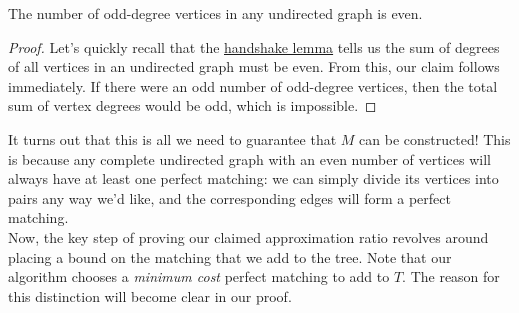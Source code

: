 \documentclass{article}
\newenvironment{lemma}[2][Lemma]{\begin{trivlist}
\item[\hskip \labelsep {\bfseries #1}\hskip \labelsep {\bfseries #2.}]}{\end{trivlist}}
\begin{document}
\begin{lemma}{3.2}{}
    The number of odd-degree vertices in any undirected graph is even.

    \begin{proof}
        Let's quickly recall that the \href{https://en.wikipedia.org/wiki/Handshaking_lemma}{\underline{handshake lemma}} tells us the sum of degrees of all vertices in an undirected graph must be even. From this, our claim follows immediately. If there were an odd number of odd-degree vertices, then the total sum of vertex degrees would be odd, which is impossible.
    \end{proof}
\end{lemma}

\noindent It turns out that this is all we need to guarantee that $M$ can be constructed! This is because any complete undirected graph with an even number of vertices will always have at least one perfect matching: we can simply divide its vertices into pairs any way we'd like, and the corresponding edges will form a perfect matching.\\

\noindent Now, the key step of proving our claimed approximation ratio revolves around placing a bound on the matching that we add to the tree. Note that our algorithm chooses a \textit{minimum cost} perfect matching to add to $T$. The reason for this distinction will become clear in our proof.
\end{document}
